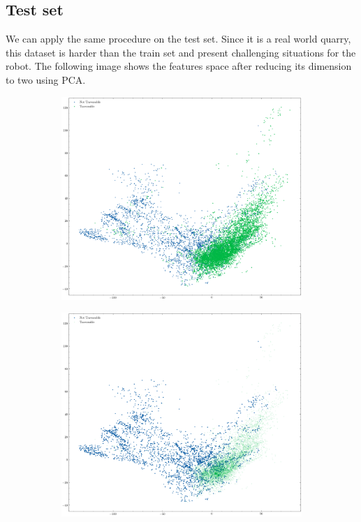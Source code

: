 \documentclass[../document.tex]{subfiles}
\begin{document}
\subsection{Test set}
We can apply the same procedure on the test set. Since it is a real world quarry, this dataset is harder than the train set and present challenging situations for the robot. The following image shows the features space after reducing its dimension to two using PCA.
\begin{figure} [htbp]
    \centering
    \begin{subfigure}[b]{1\textwidth}
        \includegraphics[width=\linewidth]{../img/5/pca/pca-test.png}
    \end{subfigure}
    \begin{subfigure}[b]{0.48\textwidth}
        \includegraphics[width=\linewidth]{../img/5/pca/pca-test-0.png}

\end{subfigure}
\end{figure}
\end{document}
